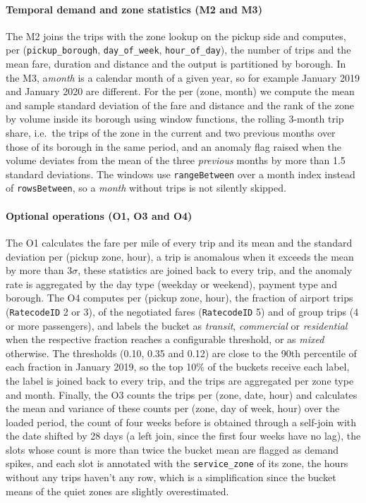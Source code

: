 \documentclass[sigconf]{acmart}
\begin{document}
\paragraph{Temporal demand and zone statistics (M2 and M3)}
The M2 joins the trips with the zone lookup on the pickup side and computes, per
(\texttt{pickup\_borough}, \texttt{day\_of\_week}, \texttt{hour\_of\_day}), the number of trips
and the mean fare, duration and distance and the output is partitioned by borough. 
In the M3, a\emph{month} is a calendar month of a given year, so for example January 2019 and January 2020 are
different.
For the per (zone, month) we compute the mean and sample standard deviation of the fare and
distance and the rank of the zone by volume inside its borough using window functions, the
rolling 3-month trip share, i.e.\ the trips of the zone in the current and two previous months
over those of its borough in the same period, and an anomaly flag raised when the volume deviates
from the mean of the three \emph{previous} months by more than 1.5 standard deviations. The
windows use \texttt{rangeBetween} over a month index instead of \texttt{rowsBetween}, so a \emph{month} without trips is not silently skipped.

\paragraph{Optional operations (O1, O3 and O4)}
The O1 calculates the fare per mile of every trip and its mean and the standard deviation per (pickup zone,
hour), a trip is anomalous when it exceeds the mean by more than $3\sigma$, these statistics are
joined back to every trip, and the anomaly rate is aggregated by the day type (weekday or weekend),
payment type and borough. 
The O4 computes per (pickup zone, hour), the fraction of airport trips
(\texttt{RatecodeID} 2 or 3), of the negotiated fares (\texttt{RatecodeID} 5) and of group trips
(4 or more passengers), and labels the bucket as \emph{transit}, \emph{commercial} or
\emph{residential} when the respective fraction reaches a configurable threshold, or as \emph{mixed} otherwise.
The thresholds (0.10, 0.35 and 0.12) are close to the 90th
percentile of each fraction in January 2019, so the top 10\% of the buckets receive
each label, the label is joined back to every trip, and the trips are aggregated per zone type
and month. 
Finally, the O3 counts the trips per (zone, date, hour) and calculates the mean and variance
of these counts per (zone, day of week, hour) over the loaded period, the count of four weeks
before is obtained through a self-join with the date shifted by 28 days (a left join, since the
first four weeks have no lag), the slots whose count is more than twice the bucket mean are
flagged as demand spikes, and each slot is annotated with the \texttt{service\_zone} of its zone,
the hours without any trips haven't any row, which is a simplification since the bucket means of the quiet zones are
slightly overestimated.
\end{document}
